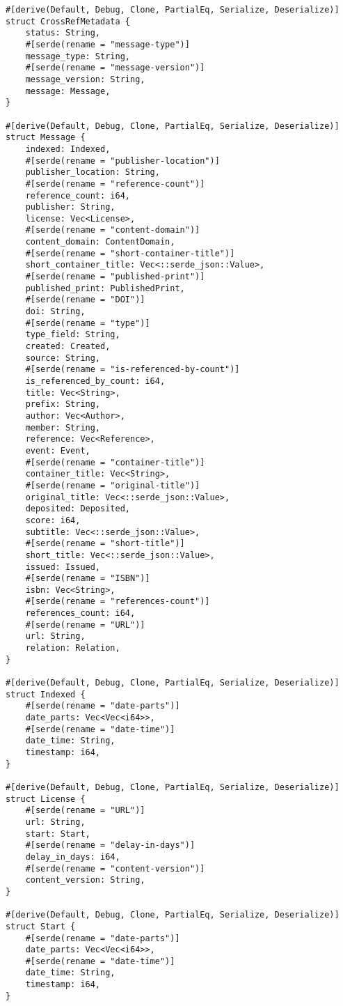 \begin{multicols}{2}
\begin{verbatim}
#[derive(Default, Debug, Clone, PartialEq, Serialize, Deserialize)]
struct CrossRefMetadata {
    status: String,
    #[serde(rename = "message-type")]
    message_type: String,
    #[serde(rename = "message-version")]
    message_version: String,
    message: Message,
}

#[derive(Default, Debug, Clone, PartialEq, Serialize, Deserialize)]
struct Message {
    indexed: Indexed,
    #[serde(rename = "publisher-location")]
    publisher_location: String,
    #[serde(rename = "reference-count")]
    reference_count: i64,
    publisher: String,
    license: Vec<License>,
    #[serde(rename = "content-domain")]
    content_domain: ContentDomain,
    #[serde(rename = "short-container-title")]
    short_container_title: Vec<::serde_json::Value>,
    #[serde(rename = "published-print")]
    published_print: PublishedPrint,
    #[serde(rename = "DOI")]
    doi: String,
    #[serde(rename = "type")]
    type_field: String,
    created: Created,
    source: String,
    #[serde(rename = "is-referenced-by-count")]
    is_referenced_by_count: i64,
    title: Vec<String>,
    prefix: String,
    author: Vec<Author>,
    member: String,
    reference: Vec<Reference>,
    event: Event,
    #[serde(rename = "container-title")]
    container_title: Vec<String>,
    #[serde(rename = "original-title")]
    original_title: Vec<::serde_json::Value>,
    deposited: Deposited,
    score: i64,
    subtitle: Vec<::serde_json::Value>,
    #[serde(rename = "short-title")]
    short_title: Vec<::serde_json::Value>,
    issued: Issued,
    #[serde(rename = "ISBN")]
    isbn: Vec<String>,
    #[serde(rename = "references-count")]
    references_count: i64,
    #[serde(rename = "URL")]
    url: String,
    relation: Relation,
}

#[derive(Default, Debug, Clone, PartialEq, Serialize, Deserialize)]
struct Indexed {
    #[serde(rename = "date-parts")]
    date_parts: Vec<Vec<i64>>,
    #[serde(rename = "date-time")]
    date_time: String,
    timestamp: i64,
}

#[derive(Default, Debug, Clone, PartialEq, Serialize, Deserialize)]
struct License {
    #[serde(rename = "URL")]
    url: String,
    start: Start,
    #[serde(rename = "delay-in-days")]
    delay_in_days: i64,
    #[serde(rename = "content-version")]
    content_version: String,
}

#[derive(Default, Debug, Clone, PartialEq, Serialize, Deserialize)]
struct Start {
    #[serde(rename = "date-parts")]
    date_parts: Vec<Vec<i64>>,
    #[serde(rename = "date-time")]
    date_time: String,
    timestamp: i64,
}


\end{verbatim}
\end{multicols}
